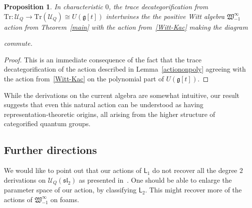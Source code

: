 \documentclass{amsart}
\numberwithin{equation}{section}
\newtheorem{proposition}[thm]{Proposition}
\theoremstyle{definition}
\newcommand{\Ucat}{\mathcal{U}_Q}
\renewcommand{\to}{\rightarrow}
\newcommand{\maps}{\colon}
\newcommand{\witt}{{\mathfrak{W}}}
\newcommand{\LLn}[1][n]{{\mathsf{L}_{#1}}}
\newcommand{\ourwitt}{{\witt_{-1}^{\infty}}}
\begin{document}
\begin{proposition}
In characteristic $0$, the trace decategorification from~\cite{Lau-trace3} $\mathrm{Tr} \maps \Ucat \to \mathrm{Tr}(\Ucat)\cong U(\mathfrak{g}[t])$ intertwines the 
the positive Witt algebra $\ourwitt$ action from Theorem~\ref{main}  with the action from~\eqref{Witt-Kac} making the diagram
       \begin{figure}[h!]
        \centering
{}
    \end{figure}
commute.  
\end{proposition}

\begin{proof}
This is an immediate consequence of the fact that the  trace decategorification  of the action described in Lemma~\ref{actiononpoly} agreeing with the action from~\eqref{Witt-Kac} on the polynomial part of $U(\mathfrak{g}[t])$.  
\end{proof}



While the derivations on the current algebra are somewhat intuitive, our result suggests that even this natural action can be understood as having representation-theoretic origins, all arising from the higher structure of categorified quantum groups.  




\subsection*{Further directions}
We would like to point out that our actions of $\LLn[1]$ do not recover all the degree $2$ derivations on $\Ucat(\mathfrak{sl}_2)$ as presented in~\cite{Elias_2016}. One should be able to enlarge the parameter space of our action, by classifying $\LLn[2]$. This might recover more of the actions of $\ourwitt$ on foams.
\end{document}
